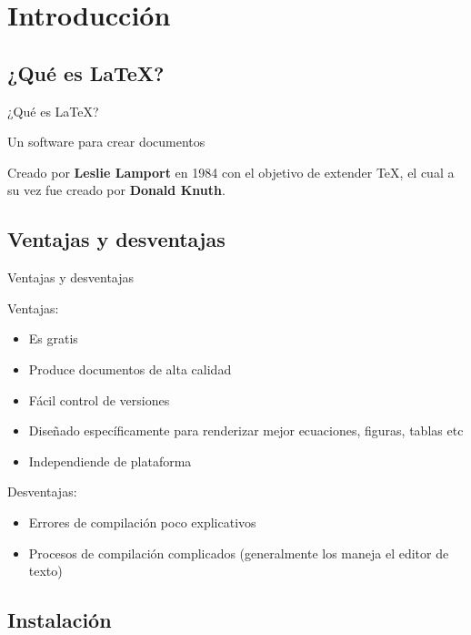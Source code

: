 \section{Introducción}\label{intro}

\frame{\tableofcontents[currentsection]}

\subsection{¿Qué es \LaTeX?}

\begin{frame}{¿Qué es \LaTeX?}
\begin{center}
Un software para crear documentos
\end{center}

\pause

Creado por \textbf{Leslie Lamport} en 1984 con el objetivo de extender \TeX, el
cual a su vez fue creado por \textbf{Donald Knuth}.

\end{frame}


\subsection{Ventajas y desventajas}
\begin{frame}{Ventajas y desventajas}

Ventajas:
\begin{itemize}
  \item Es gratis
  \item Produce documentos de alta calidad
  \item Fácil control de versiones
  \item Diseñado específicamente para renderizar mejor ecuaciones, figuras, tablas etc
  \item Independiende de plataforma
\end{itemize}

\pause

Desventajas:
\begin{itemize}
  \item Errores de compilación poco explicativos
  \item Procesos de compilación complicados (generalmente los maneja el editor
    de texto)
\end{itemize}

\end{frame}

\subsection{Instalación}

